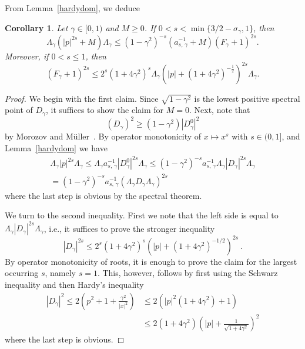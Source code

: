 \documentclass[10pt]{amsart}
\newtheorem{coro}[cdrthm]{Corollary}
\theoremstyle{definition}
\begin{document}
From Lemma~\ref{hardydom}, we deduce

\begin{coro}\label{hardydomcor}
Let $\gamma\in[0,1)$ and $M\geq0$. If $0<s<\min\{3/2-\sigma_\gamma,1\}$, then
\begin{equation}\label{eq:hardydomcorform}
\Lambda_\gamma \left(|p|^{2s}+M\right)\Lambda_\gamma
\leq \left(1-\gamma^2\right)^{-s}\left(a_{s,\,\gamma}^{-1}+M\right) \left(F_\gamma+1\right)^{2s}.
\end{equation}
Moreover, if $0<s\leq1$, then
\[
\left(F_\gamma+1\right)^{2s}
\leq 2^s\left(1+4\gamma^2\right)^s \Lambda_\gamma\left(|p|+\left(1+4\gamma^2\right)^{-\frac12} \right)^{2s}\Lambda_\gamma.
\]
\end{coro}

\begin{proof}
We begin with the first claim. Since $\sqrt{1-\gamma^2}$ is the lowest positive spectral point of $D_\gamma$, it suffices to show the claim for $M=0$. Next, note that
\[
\left(D_\gamma\right)^2 \geq \left(1-\gamma^2\right) \left|D_\gamma^0\right|^2
\]
by Morozov and M\"uller~\cite[Proof of Corollary~I.2]{MorozovMuller2017}. By operator monotonicity of $x\mapsto x^s$ with $s\in(0,1]$, and Lemma~\ref{hardydom} we have
\begin{multline*}
\Lambda_\gamma|p|^{2s}\Lambda_\gamma \leq \Lambda_\gamma a_{s,\,\gamma}^{-1}\left|D_\gamma^0\right|^{2s}\Lambda_\gamma
\leq \left(1-\gamma^2\right)^{-s}a_{s,\,\gamma}^{-1}\Lambda_\gamma\left|D_\gamma\right|^{2s}\Lambda_\gamma\\
 = \left(1-\gamma^2\right)^{-s}a_{s,\,\gamma}^{-1}\left(\Lambda_\gamma D_\gamma\Lambda_\gamma\right)^{2s}
\end{multline*}
where the last step is obvious by the spectral theorem.

We turn to the second inequality. First we note that the left side is equal to $\Lambda_\gamma |D_\gamma|^{2s}\Lambda_\gamma$, i.e., it suffices to prove the stronger inequality
\[
\left|D_\gamma\right|^{2s}\leq 2^s\left(1+4\gamma^2\right)^s\left(|p|+\left(1+4\gamma^2\right)^{-1/2}\right)^{2s}\,.
\]
By operator monotonicity of roots, it is enough to prove the claim for the largest occurring $s$, namely $s=1$. This, however, follows by first using the Schwarz inequality and then Hardy's inequality
\begin{align*}
\left|D_\gamma\right|^2 \leq 2\left(p^2+1+\frac{\gamma^2}{|x|^2}\right)
&\leq 2 \left(|p|^2\left(1+4\gamma^2\right)+1\right)\\ &\leq 2\left(1+4\gamma^2\right)\left(|p|+\frac{1}{\sqrt{1+4\gamma^2}}\right)^2
\end{align*}
where the last step is obvious.
\end{proof}
\end{document}
